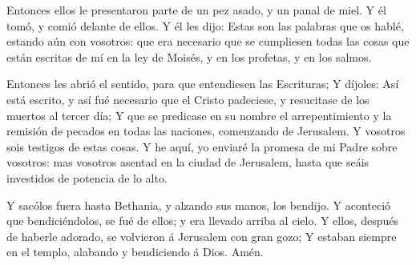  Entonces ellos le presentaron parte de un pez asado, y un
panal de miel.  Y él tomó, y comió delante de ellos.
 Y él les dijo: Estas son las palabras que os hablé,
estando aún con vosotros: que era necesario que se cumpliesen todas las
cosas que están escritas de mí en la ley de Moisés, y en los profetas, y
en los salmos.

 Entonces les abrió el sentido, para que entendiesen las
Escrituras;  Y díjoles: Así está escrito, y así fué
necesario que el Cristo padeciese, y resucitase de los muertos al tercer
día;  Y que se predicase en su nombre el arrepentimiento y
la remisión de pecados en todas las naciones, comenzando de Jerusalem.
 Y vosotros sois testigos de estas cosas.  Y
he aquí, yo enviaré la promesa de mi Padre sobre vosotros: mas vosotros
asentad en la ciudad de Jerusalem, hasta que seáis investidos de
potencia de lo alto.

 Y sacólos fuera hasta Bethania, y alzando sus manos, los
bendijo.  Y aconteció que bendiciéndolos, se fué de ellos;
y era llevado arriba al cielo.  Y ellos, después de haberle
adorado, se volvieron á Jerusalem con gran gozo;  Y estaban
siempre en el templo, alabando y bendiciendo á Dios. Amén.
